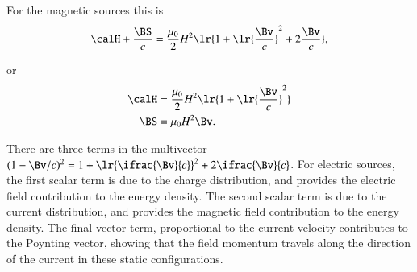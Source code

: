 For the magnetic sources this is
\begin{dmath}\label{eqn:poyntingF:920}
\calH + \frac{\BS}{c} = \frac{\mu_0}{2} H^2 \lr{ 1 + \lr{ \frac{\Bv}{c} }^2 + 2 \frac{\Bv}{c} },
\end{dmath}

or
\begin{dmath}\label{eqn:poyntingF:940}
\begin{aligned}
\calH &= \frac{\mu_0}{2} H^2 \lr{ 1 + \lr{ \frac{\Bv}{c} }^2 } \\
\BS &= \mu_0 H^2 \Bv.
\end{aligned}
\end{dmath}

There are three terms in the multivector \( (1 -\Bv/c)^2 = 1 + \lr{ \ifrac{\Bv}{c} }^2 + 2 \ifrac{\Bv}{c} \).  For electric sources,
the first scalar term is due to the charge distribution, and provides the electric field contribution to the energy density.
The second scalar term is due to the current distribution, and provides the magnetic field contribution to the energy density.
The final vector term, proportional to the current velocity contributes to the Poynting vector, showing that the field momentum travels along the direction of the current in these static configurations.
